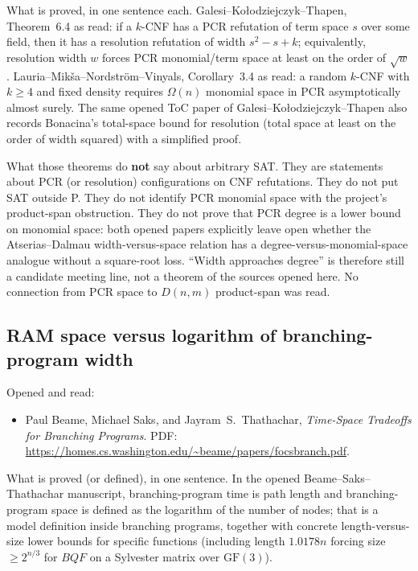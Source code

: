 \documentclass[11pt]{article}
\begin{document}
What is proved, in one sentence each.
Galesi--Ko\l{}odziejczyk--Thapen, Theorem~6.4 as read: if a \(k\)-CNF has a PCR refutation of term space \(s\) over some field, then it has a resolution refutation of width \(s^2-s+k\); equivalently, resolution width \(w\) forces PCR monomial/term space at least on the order of \(\sqrt{w}\).
Lauria--Mik\v{s}a--Nordstr\"om--Vinyals, Corollary~3.4 as read: a random \(k\)-CNF with \(k\ge 4\) and fixed density requires \(\Omega(n)\) monomial space in PCR asymptotically almost surely.
The same opened ToC paper of Galesi--Ko\l{}odziejczyk--Thapen also records Bonacina's total-space bound for resolution (total space at least on the order of width squared) with a simplified proof.

What those theorems do \textbf{not} say about arbitrary SAT.
They are statements about PCR (or resolution) configurations on CNF refutations.
They do not put SAT outside P.
They do not identify PCR monomial space with the project's product-span obstruction.
They do not prove that PCR degree is a lower bound on monomial space: both opened papers explicitly leave open whether the Atserias--Dalmau width-versus-space relation has a degree-versus-monomial-space analogue without a square-root loss.
``Width approaches degree'' is therefore still a candidate meeting line, not a theorem of the sources opened here.
No connection from PCR space to \(D(n,m)\) product-span was read.

\subsection*{RAM space versus logarithm of branching-program width}
Opened and read:
\begin{itemize}
\item Paul Beame, Michael Saks, and Jayram~S.\ Thathachar,
\emph{Time-Space Tradeoffs for Branching Programs}.
PDF: \url{https://homes.cs.washington.edu/~beame/papers/focsbranch.pdf}.
\end{itemize}

What is proved (or defined), in one sentence.
In the opened Beame--Saks--Thathachar manuscript, branching-program time is path length and branching-program space is defined as the logarithm of the number of nodes; that is a model definition inside branching programs, together with concrete length-versus-size lower bounds for specific functions (including length \(1.0178n\) forcing size \(\ge 2^{n/3}\) for \(BQF\) on a Sylvester matrix over \(\mathrm{GF}(3)\)).
\end{document}

